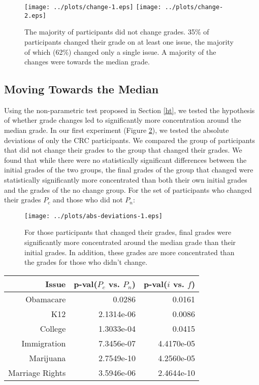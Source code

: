 \begin{figure}[h]
\hspace*{-2em}
    \texttt{[image: ../plots/change-1.eps]}
    \hspace*{-2em}
    \texttt{[image: ../plots/change-2.eps]}
      \caption{The majority of participants did not change grades. 35\% of participants changed their grade on at least one issue, the majority of which (62\%) changed only a single issue. A majority of the changes were towards the median grade.}
      \label{change-1}
\end{figure}

\subsection{Moving Towards the Median}
Using the non-parametric test proposed in Section \ref{ht}, we tested the hypothesis of whether grade changes led to significantly more concentration around the median grade.
In our first experiment (Figure \ref{mdev-1}), we tested the absolute deviations of only the CRC participants.
We compared the group of participants that did not change their grades to the group that changed their grades.
We found that while there were no statistically significant differences between the initial grades of the two groups, the final grades of the group that changed were statistically significantly more concentrated than both their own initial grades and the grades of the no change group.
For the set of participants who changed their grades $P_c$ and those who did not $P_n$:
\begin{figure}[h]
\hspace{-2em}
    \texttt{[image: ../plots/abs-deviations-1.eps]}
      \caption{For those participants that changed their grades, final grades were significantly more concentrated around the median grade than their initial grades. In addition, these grades are more concentrated than the grades for those who didn't change.}
      \label{mdev-1}
\end{figure}

{\centering
\scriptsize
\begin{tabular}[!ht] { r | r | r }
\label{dev-2}
  Issue & p-val($P_c$ vs. $P_n$) & p-val($i$ vs. $f$) \\
  \hline
  \hline
  Obamacare &  0.0286 & 0.0161 \\
  \hline
  K12 & 2.1314e-06 &  0.0086 \\
  \hline
  College & 1.3033e-04 & 0.0415 \\
  \hline
  Immigration & 7.3456e-07 &4.4170e-05\\
  \hline
  Marijuana & 2.7549e-10 & 4.2560e-05\\
  \hline
  Marriage Rights & 3.5946e-06 & 2.4644e-10 \\
\end{tabular}\\[1\baselineskip]
}

